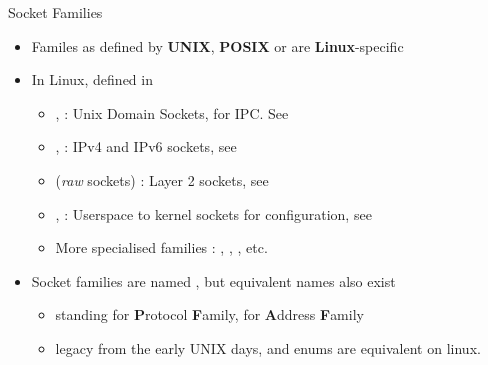 \begin{frame}{Socket Families}
	\vspace{1cm}
	\begin{itemize}
		\item Familes as defined by \textbf{UNIX}, \textbf{POSIX} or are \textbf{Linux}-specific
		\item In Linux, defined in 
			\begin{itemize}
				\item {},  : Unix Domain Sockets, for IPC. See 
				\item {},  : IPv4 and IPv6 sockets, see 
				\item {} (\textit{raw} sockets) : Layer 2 sockets, see 
				\item {},  : Userspace to kernel sockets for configuration, see 
				\item More specialised families : , , , etc.
			\end{itemize}
		\item Socket families are named , but equivalent names  also exist
			\begin{itemize}
				\item {} standing for \textbf{P}rotocol \textbf{F}amily,  for \textbf{A}ddress \textbf{F}amily
				\item legacy from the early UNIX days,  and  enums are equivalent on linux.
			\end{itemize}
	\end{itemize}
\end{frame}

